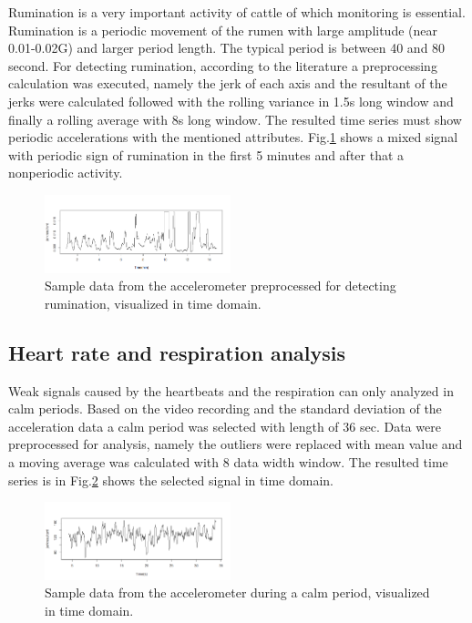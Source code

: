 \documentclass[conference]{IEEEtran}
\begin{document}
Rumination is a very important activity of cattle of which monitoring is
essential. Rumination is a periodic movement of the rumen with large amplitude
(near 0.01-0.02G) and larger period length. The typical period is between 40
and 80 second. For detecting rumination, according to the literature a
preprocessing calculation was executed, namely the jerk of each axis and the
resultant of the jerks were calculated followed with the rolling variance in
1.5s long window and finally a rolling average with 8s long window. The
resulted time series must show periodic accelerations with the mentioned
attributes. Fig.\ref{rumination} shows a mixed signal with periodic sign of
rumination in the first 5 minutes and after that a nonperiodic activity.

\begin{figure}[htbp]
\centerline{\includegraphics[width=0.48\textwidth]{fig/rumination.png}}
  \caption{Sample data from the accelerometer preprocessed for detecting
  rumination, visualized in time domain.}
\label{rumination}
\end{figure}

\subsection{Heart rate and respiration analysis}

Weak signals caused by the heartbeats and the respiration can only analyzed in
calm periods. Based on the video recording and the standard deviation of the
acceleration data a calm period was selected with length of 36 sec. Data were
preprocessed for analysis, namely the outliers were replaced with mean value
and a moving average was calculated with 8 data width window. The resulted time
series is in Fig.\ref{heart-time-domain}  shows the selected signal in time
domain.

\begin{figure}[htbp]
\centerline{\includegraphics[width=0.48\textwidth]{fig/ts_heart.png}}
  \caption{Sample data from the accelerometer during a calm period, visualized
  in time domain.}
\label{heart-time-domain}
\end{figure}
\end{document}
